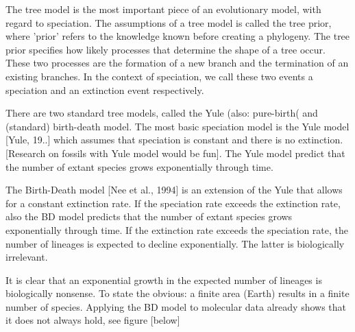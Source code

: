 %
%


The tree model is the most important piece of an evolutionary model,
with regard to speciation. The assumptions of a tree model is 
called the tree prior, where 'prior' refers to the knowledge
known before creating a phylogeny. The tree prior specifies how likely
processes that determine the shape of a tree occur. These
two processes are the formation of a new branch and the termination of
an existing branches. In the context of speciation, we call these
two events a speciation and an extinction event respectively.

There are two standard tree models, called the Yule (also: pure-birth(
and (standard) birth-death model. The most basic speciation model
is the Yule model [Yule, 19..] which assumes that speciation
is constant and there is no extinction.
[Research on fossils with Yule model would be fun].
The Yule model predict that the number of extant species
grows exponentially through time.

%

The Birth-Death model [Nee et al., 1994] is an extension of the
Yule that allows for a constant extinction rate. 
If the speciation rate exceeds the extinction rate,
also the BD model predicts that the number of extant species
grows exponentially through time. If the extinction rate exceeds
the speciation rate, the number of lineages is expected to decline
exponentially. The latter is biologically irrelevant.

%

It is clear that an exponential growth in the expected number of lineages
is biologically nonsense. 
To state the obvious: a finite area (Earth) results in a finite number of species. 
Applying the BD model to molecular data already shows that it does not
always hold, see figure [below]

%
%
%
%
%

%
%
%

